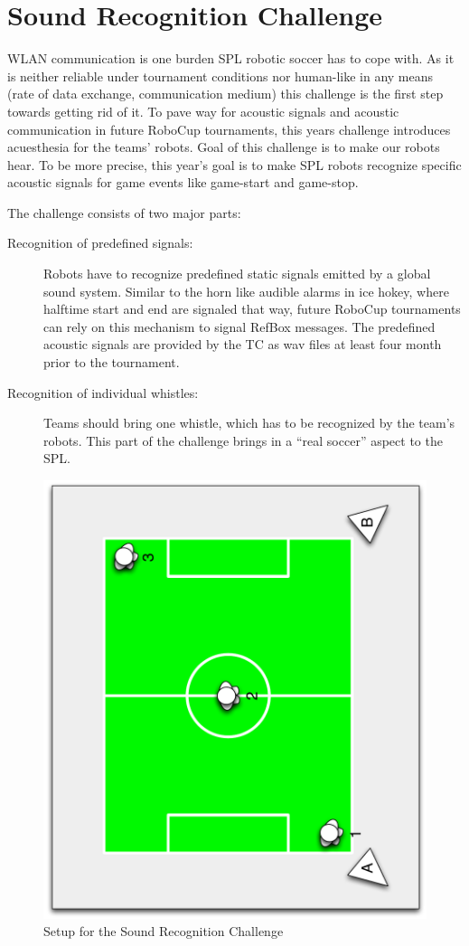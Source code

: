 \documentclass[12pt]{article}
\begin{document}
\section{Sound Recognition Challenge}

WLAN communication is one burden SPL robotic soccer has to cope with. As it is neither reliable under tournament conditions nor human-like in any means (rate of data exchange, communication medium) this challenge is the first step towards getting rid of it. To pave way for acoustic signals and acoustic communication in future RoboCup tournaments, this years challenge introduces acuesthesia for the teams' robots. Goal of this challenge is to make our robots hear. To be more precise, this year's goal is to make SPL robots recognize specific acoustic signals for game events like game-start and game-stop.

The challenge consists of two major parts:
\begin{description}
	\item[Recognition of predefined signals:]Robots have to recognize predefined static signals emitted by a global sound system. Similar to the horn like audible alarms in ice hokey, where halftime start and end are signaled that way, future RoboCup tournaments can rely on this mechanism to signal RefBox messages. The predefined acoustic signals are provided by the TC as wav files at least four month prior to the tournament.
	
	\item[Recognition of individual whistles:]Teams should bring one whistle, which has to be recognized by the team's robots. This part of the challenge brings in a ``real soccer'' aspect to the SPL.
	
\end{description}

\begin{figure}[th!]
\centerline{\includegraphics[width=0.6\columnwidth,angle=270]{figures/acuesthesia}}
\caption{Setup for the Sound Recognition Challenge}
\label{fig:recognition_challenge}
\end{figure}
\end{document}
